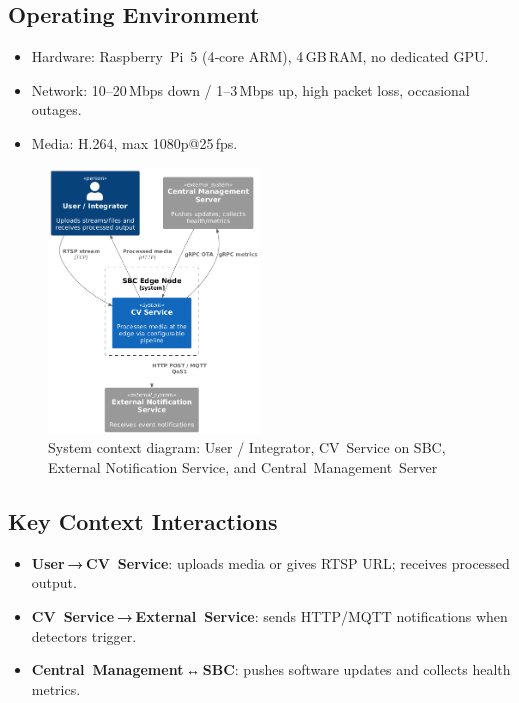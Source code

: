 \documentclass[11pt,a4paper]{article}
\begin{document}
\subsection*{Operating Environment}
\begin{itemize}
  \item Hardware: Raspberry Pi 5 (4‑core ARM), 4 GB RAM, no dedicated GPU.
  \item Network: 10–20 Mbps down / 1–3 Mbps up, high packet loss, occasional outages.
  \item Media: H.264, max 1080p@25 fps.
\end{itemize}

\begin{figure}[H]
  \centering
  \includegraphics[width=0.5\textwidth]{fig/context_diagram.png}
  \caption{System context diagram: User / Integrator, CV Service on SBC, External Notification Service, and Central Management Server}
  \label{fig:context}
\end{figure}

\subsection*{Key Context Interactions}
\begin{itemize}
  \item \textbf{User → CV Service}: uploads media or gives RTSP URL; receives processed output.
  \item \textbf{CV Service → External Service}: sends HTTP/MQTT notifications when detectors trigger.
  \item \textbf{Central Management ↔ SBC}: pushes software updates and collects health metrics.
\end{itemize}
\end{document}
